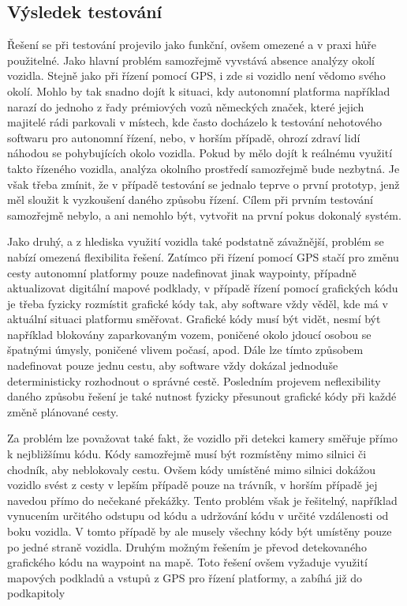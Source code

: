 \documentclass[czech, bachelor]{diploma}
\begin{document}
\subsection{Výsledek testování}

Řešení se při testování projevilo jako funkční, ovšem omezené a v praxi hůře použitelné. Jako hlavní problém samozřejmě vyvstává
absence analýzy okolí vozidla. Stejně jako při řízení pomocí GPS, i zde si vozidlo není vědomo svého okolí. Mohlo by tak snadno
dojít k situaci, kdy autonomní platforma například narazí do jednoho z řady prémiových vozů německých značek, které jejich
majitelé rádi parkovali v místech, kde často docházelo k testování nehotového softwaru pro autonomní řízení, nebo, v horším
případě, ohrozí zdraví lidí náhodou se pohybujících okolo vozidla. Pokud by mělo dojít k reálnému využití takto řízeného vozidla,
analýza okolního prostředí samozřejmě bude nezbytná. Je však třeba zmínit, že v případě testování se jednalo teprve o první
prototyp, jenž měl sloužit k vyzkoušení daného způsobu řízení. Cílem při prvním testování samozřejmě nebylo, a ani nemohlo být,
vytvořit na první pokus dokonalý systém.

Jako druhý, a z hlediska využití vozidla také podstatně závažnější, problém se nabízí omezená flexibilita řešení. Zatímco při
řízení pomocí GPS stačí pro změnu cesty autonomní platformy pouze nadefinovat jinak waypointy, případně aktualizovat digitální
mapové podklady, v případě řízení pomocí grafických kódu je třeba fyzicky rozmístit grafické kódy tak, aby software vždy věděl,
kde má v aktuální situaci platformu směřovat. Grafické kódy musí být vidět, nesmí být například blokovány zaparkovaným vozem,
poničené okolo jdoucí osobou se špatnými úmysly, poničené vlivem počasí, apod. Dále lze tímto způsobem nadefinovat pouze jednu
cestu, aby software vždy dokázal jednoduše deterministicky rozhodnout o správné cestě. Posledním projevem neflexibility daného
způsobu řešení je také nutnost fyzicky přesunout grafické kódy při každé změně plánované cesty.

Za problém lze považovat také fakt, že vozidlo při detekci kamery směřuje přímo k nejbližšímu kódu. Kódy samozřejmě musí být
rozmístěny mimo silnici či chodník, aby neblokovaly cestu. Ovšem kódy umístěné mimo silnici dokážou vozidlo svést z cesty
v lepším případě pouze na trávník, v horším případě jej navedou přímo do nečekané překážky. Tento problém však je řešitelný,
například vynucením určitého odstupu od kódu a udržování kódu v určité vzdálenosti od boku vozidla.  V tomto případě by ale musely
všechny kódy být umístěny pouze po jedné straně vozidla. Druhým možným řešením je převod detekovaného grafického kódu na waypoint
na mapě. Toto řešení ovšem vyžaduje využití mapových podkladů a vstupů z GPS pro řízení platformy, a zabíhá již do podkapitoly
\end{document}
